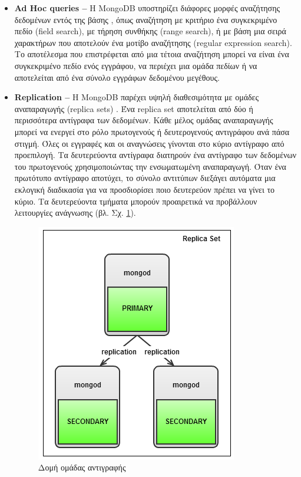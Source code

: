 \begin{itemize}
    \item {}\textbf{Ad Hoc queries --} Η MongoDB υποστηρίζει διάφορες μορφές αναζήτησης δεδομένων εντός της βάσης \cite{[MONGO1]}, όπως αναζήτηση με κριτήριο ένα συγκεκριμένο πεδίο (field search), με τήρηση συνθήκης (range search), ή με βάση μια σειρά χαρακτήρων που αποτελούν ένα μοτίβο αναζήτησης (regular expression search). Το αποτέλεσμα που επιστρέφεται από μια τέτοια αναζήτηση μπορεί να είναι ένα συγκεκριμένο πεδίο ενός εγγράφου, να περιέχει μια ομάδα πεδίων ή να αποτελείται από ένα σύνολο εγγράφων δεδομένου μεγέθους.
    \item {}\textbf{Replication --} Η MongoDB παρέχει υψηλή διαθεσιμότητα με ομάδες αναπαραγωγής (replica sets) \cite{[MONGO2]}. Ένα replica set αποτελείται από δύο ή περισσότερα αντίγραφα των δεδομένων. Κάθε μέλος ομάδας αναπαραγωγής μπορεί να ενεργεί στο ρόλο πρωτογενούς ή δευτερογενούς αντιγράφου ανά πάσα στιγμή. Όλες οι εγγραφές και οι αναγνώσεις γίνονται στο κύριο αντίγραφο από προεπιλογή. Τα δευτερεύοντα αντίγραφα διατηρούν ένα αντίγραφο των δεδομένων του πρωτογενούς χρησιμοποιώντας την ενσωματωμένη αναπαραγωγή. Όταν ένα πρωτότυπο αντίγραφο αποτύχει, το σύνολο αντιτύπων διεξάγει αυτόματα μια εκλογική διαδικασία για να προσδιορίσει ποιο δευτερεύον πρέπει να γίνει το κύριο. Τα δευτερεύοντα τμήματα μπορούν προαιρετικά να προβάλλουν λειτουργίες ανάγνωσης (βλ. Σχ. \ref{replicaset}).
    
    \begin{figure}[h]
        \centering
        \includegraphics[scale=0.4]{figures/repset.png}
        \caption{Δομή ομάδας αντιγραφής}
        \label{replicaset}
    \end{figure}
    

\end{itemize}
